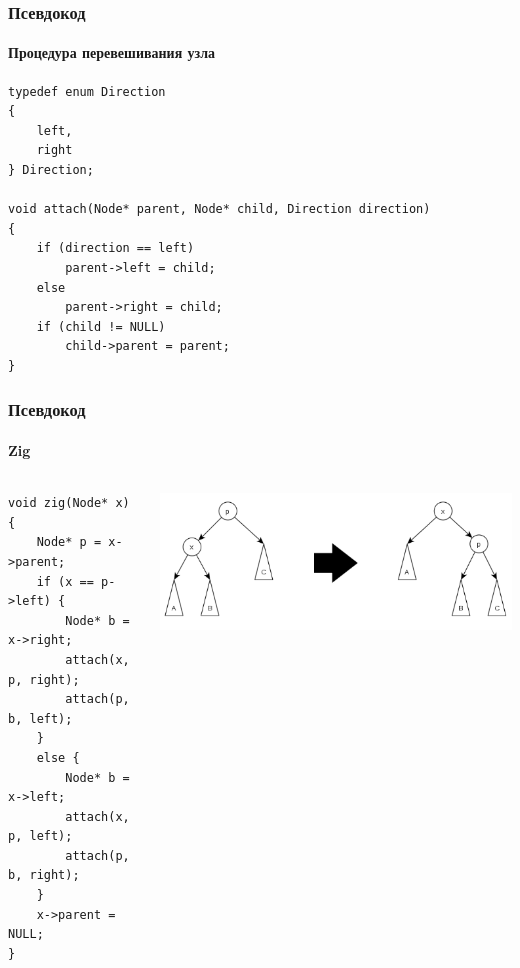 \documentclass{../../slides-style}
\begin{document}
    \begin{frame}[fragile]
        \frametitle{Псевдокод}
        \framesubtitle{Процедура перевешивания узла}
        \begin{verbatim}
typedef enum Direction
{
    left,
    right
} Direction;

void attach(Node* parent, Node* child, Direction direction)
{
    if (direction == left)
        parent->left = child;
    else
        parent->right = child;
    if (child != NULL)
        child->parent = parent;
}
        \end{verbatim}
    \end{frame}

    \begin{frame}[fragile]
        \frametitle{Псевдокод}
        \framesubtitle{Zig}
        \begin{columns}
            \begin{column}{0.5\textwidth}
                \begin{verbatim}
void zig(Node* x)
{
    Node* p = x->parent;
    if (x == p->left) {
        Node* b = x->right;
        attach(x, p, right);
        attach(p, b, left);
    }
    else {
        Node* b = x->left;
        attach(x, p, left);
        attach(p, b, right);
    }
    x->parent = NULL;
}
                \end{verbatim}
            \end{column}
            \begin{column}{0.5\textwidth}
                \begin{center}
                    \includegraphics[width=\textwidth]{zig.png}
                \end{center}
            \end{column}
        \end{columns}
    \end{frame}
\end{document}
